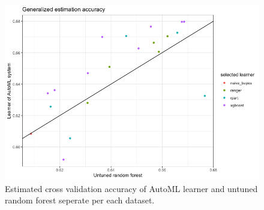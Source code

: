 \documentclass{article}
\begin{document}
\begin{figure}[h]
       \centering
       \includegraphics[width=12cm] {image/estimation_accuracy.png}
       \caption{Estimated cross validation accuracy of AutoML learner and untuned random forest seperate per each dataset.}
       \label{acc}
\end{figure}
\end{document}
